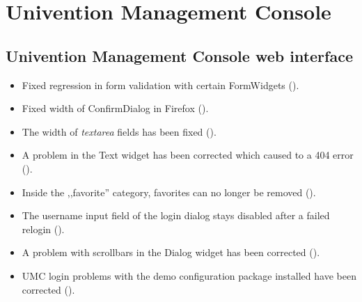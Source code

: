 




\section{Univention Management Console}

\subsection{Univention Management Console web interface}
\begin{itemize}
\item Fixed regression in form validation with certain FormWidgets
  ().
\item Fixed width of ConfirmDialog in Firefox ().
\item The width of \emph{textarea} fields has been fixed
  ().
\item A problem in the Text widget has been corrected which caused to
  a 404 error ().
\item Inside the ,,favorite'' category, favorites can no longer be
  removed ().
\item The username input field of the login dialog stays disabled
  after a failed relogin ().
\item A problem with scrollbars in the Dialog widget has been
  corrected ().
\item UMC login problems with the demo configuration package installed have
  been corrected ().
\end{itemize}

